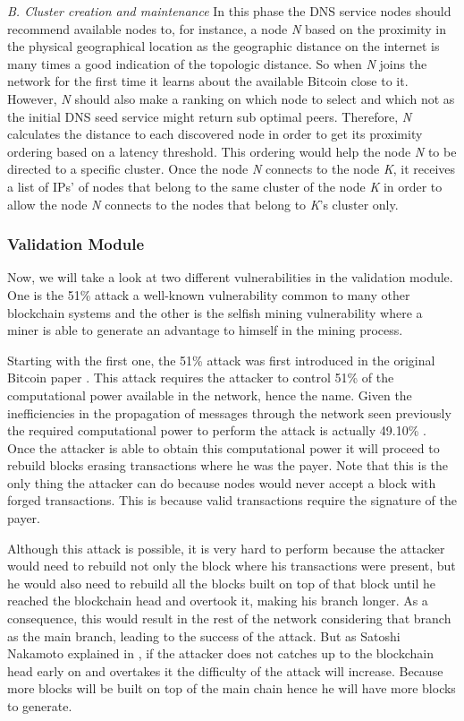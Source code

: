 \textsl{B. Cluster creation and maintenance} In this phase the DNS service nodes should recommend available nodes to, for instance, a node \textsl{N} based on the proximity in the physical geographical location as the geographic distance on the internet is many times a good indication of the topologic distance. So when \textsl{N} joins the network for the first time it learns about the available Bitcoin close to it. However, \textsl{N} should also make a ranking on which node to select and which not as the initial DNS seed service might return sub optimal peers. Therefore, \textsl{N} calculates the distance to each discovered node in order to get its proximity ordering based on a latency threshold. This ordering would help the node \textsl{N} to be directed to a specific cluster. Once the node \textsl{N} connects to the node \textsl{K}, it receives a list of IPs’ of nodes that belong to the same cluster of the node \textsl{K} in order to allow the node \textsl{N} connects to the nodes that belong to \textsl{K}’s cluster only.



\subsubsection{Validation Module}
\label{sec:validation_module}
Now, we will take a look at two different vulnerabilities in the validation module. One is the 51\% attack a well-known vulnerability common to many other blockchain systems and the other is the selfish mining vulnerability where a miner is able to generate an advantage to himself in the mining process.

\label{sec:51attack}
Starting with the first one, the 51\% attack was first introduced in the original Bitcoin paper \cite{nakamoto2008bitcoin}. This attack requires the attacker to control 51\% of the computational power available in the network, hence the name. Given the inefficiencies in the propagation of messages through the network seen previously the required computational power to perform the attack is actually 49.10\% \cite{decker2013information}. Once the attacker is able to obtain this computational power it will proceed to rebuild blocks erasing transactions where he was the payer. Note that this is the only thing the attacker can do because nodes would never accept a block with forged transactions. This is because valid transactions require the signature of the payer.

Although this attack is possible, it is very hard to perform because the attacker would need to rebuild not only the block where his transactions were present, but he would also need to rebuild all the blocks built on top of that block until he reached the blockchain head and overtook it, making his branch longer. As a consequence, this would result in the rest of the network considering that branch as the main branch, leading to the success of the attack. But as Satoshi Nakamoto explained in \cite{nakamoto2008bitcoin}, if the attacker does not catches up to the blockchain head early on and overtakes it the difficulty of the attack will increase. Because more blocks will be built on top of the main chain hence he will have more blocks to generate.


